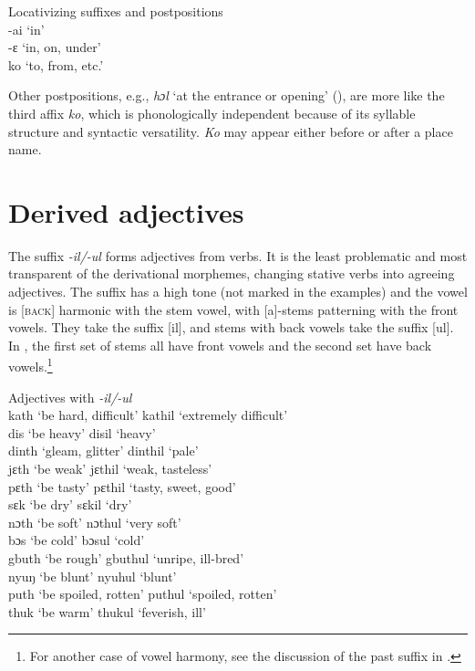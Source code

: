 \ea%
    \label{ex:173}
    Locativizing suffixes and postpositions\\

{}-ai \tab ‘in'\\
{}-ɛ \tab ‘in, on, under'\\
ko \tab ‘to, from, etc.'\\
\z

Other postpositions, e.g., \textit{hɔl} ‘at the entrance or opening' (), are more like the third affix \textit{ko}, which is phonologically independent because of its syllable structure and syntactic versatility. \textit{Ko} may appear either before or after a place name.

\section{Derived adjectives}
\label{sec:7.2}\hypertarget{Toc115517806}{}
The suffix \textit{{}-il/-ul} forms adjectives from verbs. It is the least problematic and most transparent of the derivational morphemes, changing stative verbs into agreeing adjectives. The suffix has a high tone (not marked in the examples) and the vowel is [\textsc{back}] harmonic with the stem vowel, with [a]-stems patterning with the front vowels. They take the suffix [il], and stems with back vowels take the suffix [ul]. In , the first set of stems all have front vowels and the second set have back vowels.\footnote{For another case of vowel harmony, see the discussion of the past suffix in .}


\TabPositions{1.5cm,5.5cm,7cm,8cm}
\ea%
    \label{ex:174} Adjectives with \textit{{}-il/-ul}\\
    \vspace{6pt}
    kath \tab ‘be hard, difficult' \tab kathil \tab ‘extremely difficult'\\
    dis \tab ‘be heavy' \tab disil \tab ‘heavy'\\
    dinth \tab ‘gleam, glitter' \tab dinthil \tab ‘pale'\\
    jɛth \tab ‘be weak' \tab jɛthil \tab ‘weak, tasteless'\\
    pɛth \tab ‘be tasty' \tab pɛthil \tab ‘tasty, sweet, good'\\
    sɛk \tab ‘be dry' \tab sɛkil \tab ‘dry'\footnotemark\\ 
  \vspace{10pt}
    nɔth \tab ‘be soft' \tab nɔthul \tab ‘very soft'\\
    bɔs \tab ‘be cold' \tab bɔsul \tab ‘cold'\\
    gbuth \tab ‘be rough' \tab gbuthul \tab ‘unripe, ill-bred'\\
    nyuŋ \tab ‘be blunt' \tab nyuhul \tab ‘blunt'\\
    puth \tab ‘be spoiled, rotten' \tab puthul \tab ‘spoiled, rotten'\\
    thuk \tab ‘be warm' \tab thukul \tab ‘feverish, ill'\\
\z
{}

